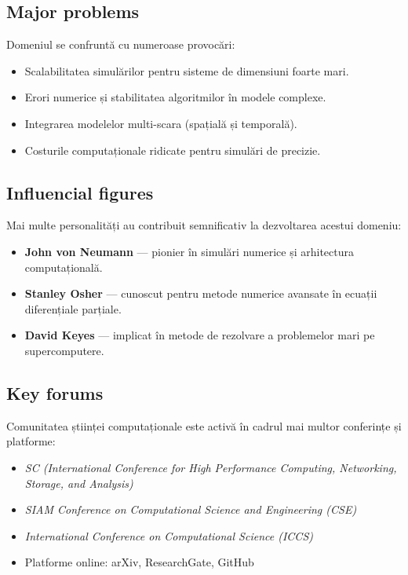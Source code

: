 \documentclass[12pt, letterpaper]{article}
\begin{document}
\subsection*{Major problems}
Domeniul se confruntă cu numeroase provocări:
\begin{itemize}
    \item Scalabilitatea simulărilor pentru sisteme de dimensiuni foarte mari.
    \item Erori numerice și stabilitatea algoritmilor în modele complexe.
    \item Integrarea modelelor multi-scara (spațială și temporală).
    \item Costurile computaționale ridicate pentru simulări de precizie.
\end{itemize}

\subsection*{Influencial figures}
Mai multe personalități au contribuit semnificativ la dezvoltarea acestui domeniu:
\begin{itemize}
    \item \textbf{John von Neumann} — pionier în simulări numerice și arhitectura computațională.
    \item \textbf{Stanley Osher} — cunoscut pentru metode numerice avansate în ecuații diferențiale parțiale.
    \item \textbf{David Keyes} — implicat în metode de rezolvare a problemelor mari pe supercomputere.
\end{itemize}

\subsection*{Key forums}
Comunitatea științei computaționale este activă în cadrul mai multor conferințe și platforme:
\begin{itemize}
    \item \textit{SC (International Conference for High Performance Computing, Networking, Storage, and Analysis)}
    \item \textit{SIAM Conference on Computational Science and Engineering (CSE)}
    \item \textit{International Conference on Computational Science (ICCS)}
    \item Platforme online: arXiv, ResearchGate, GitHub
\end{itemize}
\end{document}
